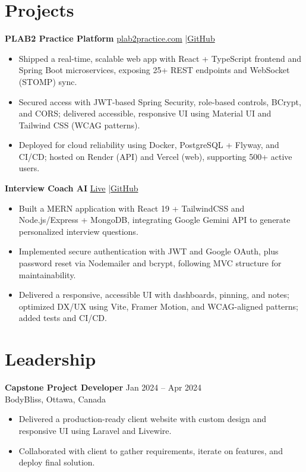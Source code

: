 \documentclass[10pt]{article}
\begin{document}
\section*{Projects}
\textbf{PLAB2 Practice Platform} \hfill \href{https://plab2practice.com}{plab2practice.com} \quad|\quad \href{https://github.com/altansaid/plab2projectnew}{GitHub}
\begin{itemize}
  \item Shipped a real-time, scalable web app with React + TypeScript frontend and Spring Boot microservices, exposing 25+ REST endpoints and WebSocket (STOMP) sync.
  \item Secured access with JWT-based Spring Security, role-based controls, BCrypt, and CORS; delivered accessible, responsive UI using Material UI and Tailwind CSS (WCAG patterns).
  \item Deployed for cloud reliability using Docker, PostgreSQL + Flyway, and CI/CD; hosted on Render (API) and Vercel (web), supporting 500+ active users.
\end{itemize}

\textbf{Interview Coach AI} \hfill \href{https://interviewcoach-ai.vercel.app/}{Live} \quad|\quad \href{https://github.com/altansaid/interviewcoach-ai}{GitHub}
\begin{itemize}
  \item Built a MERN application with React 19 + TailwindCSS and Node.js/Express + MongoDB, integrating Google Gemini API to generate personalized interview questions.
  \item Implemented secure authentication with JWT and Google OAuth, plus password reset via Nodemailer and bcrypt, following MVC structure for maintainability.
  \item Delivered a responsive, accessible UI with dashboards, pinning, and notes; optimized DX/UX using Vite, Framer Motion, and WCAG-aligned patterns; added tests and CI/CD.
\end{itemize}

\section*{Leadership}
\textbf{Capstone Project Developer} \hfill Jan 2024 -- Apr 2024\\
BodyBliss, Ottawa, Canada
\begin{itemize}
  \item Delivered a production-ready client website with custom design and responsive UI using Laravel and Livewire.
  \item Collaborated with client to gather requirements, iterate on features, and deploy final solution.
\end{itemize}
\end{document}
